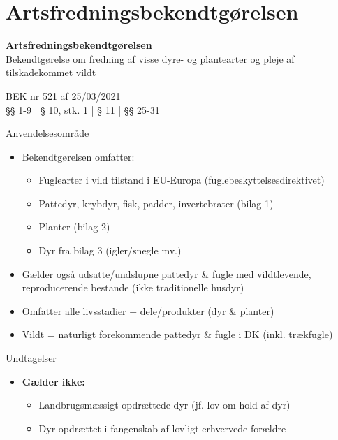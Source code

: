 \section{Artsfredningsbekendtgørelsen}

\begin{frame}
  \vspace{3em}
  \begin{center}
    {\LARGE \textbf{Artsfredningsbekendtgørelsen}}
    \vspace{2em}
    \\ Bekendtgørelse om fredning af visse dyre- og plantearter og pleje af tilskadekommet vildt
\par
{\normalsize \href{https://www.retsinformation.dk/eli/lta/2021/521}{BEK nr 521 af 25/03/2021 \\ §§ 1-9 | § 10, stk. 1 | § 11 | §§ 25-31}}
\vspace{1em}
\par
  \end{center}
\end{frame}

\begin{frame}{Anvendelsesområde}
\begin{itemize}
  \item Bekendtgørelsen omfatter:
  \begin{itemize}
    \item Fuglearter i vild tilstand i EU-Europa (fuglebeskyttelsesdirektivet)
    \item Pattedyr, krybdyr, fisk, padder, invertebrater (bilag 1)
    \item Planter (bilag 2)
    \item Dyr fra bilag 3 (igler/snegle mv.)
  \end{itemize}
  \item Gælder også udsatte/undslupne pattedyr \& fugle med vildtlevende, reproducerende bestande (ikke traditionelle husdyr)
  \item Omfatter alle livsstadier + dele/produkter (dyr \& planter)
  \item Vildt = naturligt forekommende pattedyr \& fugle i DK (inkl. trækfugle)
\end{itemize}
\end{frame}

\begin{frame}{Undtagelser}
\begin{itemize}
  \item \textbf{Gælder ikke:}
  \begin{itemize}
    \item Landbrugsmæssigt opdrættede dyr (jf. lov om hold af dyr)
    \item Dyr opdrættet i fangenskab af lovligt erhvervede forældre
  \end{itemize}
  \end{itemize}
\end{frame}

